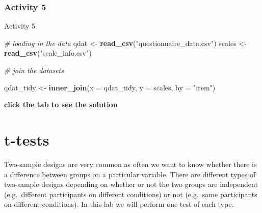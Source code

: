 \documentclass[]{book}
\newenvironment{Shaded}{\begin{snugshade}}{\end{snugshade}}
\newcommand{\CommentTok}[1]{\textcolor[rgb]{0.56,0.35,0.01}{\textit{#1}}}
\newcommand{\DataTypeTok}[1]{\textcolor[rgb]{0.13,0.29,0.53}{#1}}
\newcommand{\KeywordTok}[1]{\textcolor[rgb]{0.13,0.29,0.53}{\textbf{#1}}}
\newcommand{\NormalTok}[1]{#1}
\newcommand{\StringTok}[1]{\textcolor[rgb]{0.31,0.60,0.02}{#1}}
\begin{document}
\hypertarget{activity-5-3}{%
\subsection{Activity 5}\label{activity-5-3}}

Activity 5

\begin{Shaded}
\begin{Highlighting}[]
\CommentTok{# loading in the data}
\NormalTok{qdat <-}\StringTok{ }\KeywordTok{read_csv}\NormalTok{(}\StringTok{"questionnaire_data.csv"}\NormalTok{)}
\NormalTok{scales <-}\StringTok{ }\KeywordTok{read_csv}\NormalTok{(}\StringTok{"scale_info.csv"}\NormalTok{)}

\CommentTok{# join the datasets}

\NormalTok{qdat_tidy <-}\StringTok{ }\KeywordTok{inner_join}\NormalTok{(}\DataTypeTok{x =}\NormalTok{ qdat_tidy, }\DataTypeTok{y =}\NormalTok{ scales, }\DataTypeTok{by =} \StringTok{"item"}\NormalTok{)}
\end{Highlighting}
\end{Shaded}

\textbf{click the tab to see the solution}

\hypertarget{t-tests}{%
\chapter{t-tests}\label{t-tests}}

Two-sample designs are very common as often we want to know whether there is a difference between groups on a particular variable. There are different types of two-sample designs depending on whether or not the two groups are independent (e.g.~different participants on different conditions) or not (e.g.~same participants on different conditions). In this lab we will perform one test of each type.
\end{document}
